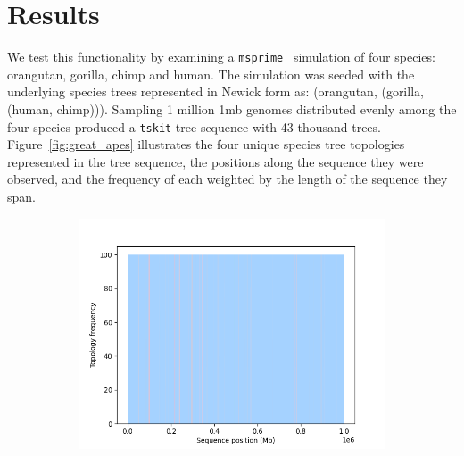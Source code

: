 \documentclass{article}
\newcommand{\tskit}{{\texttt{tskit}}}
\newcommand{\msprime}{{\texttt{msprime}}}
\begin{document}
\section{Results}
We test this functionality by examining a \msprime{}~\citep{msprime} simulation of four species:
orangutan, gorilla, chimp and human. The simulation was seeded with the underlying
species trees represented in Newick form as: (orangutan, (gorilla, (human, chimp))).
Sampling 1 million 1mb genomes distributed evenly among the four species
produced a \tskit{} tree sequence with 43 thousand trees.
Figure~\ref{fig:great_apes} illustrates the four unique
species tree topologies represented in the tree sequence, the positions
along the sequence they were observed, and the frequency of each weighted by
the length of the sequence they span.

\begin{figure}[H]
    \begin{minipage}{.48\textwidth}
        \begin{subfigure}{\linewidth}
            \includegraphics[scale=0.48]{great_apes_area_plot.png}
        \end{subfigure}
    \end{minipage}
    \begin{minipage}{.48\textwidth}
        \begin{minipage}{.4\textwidth}
            \begin{subfigure}[b]{\linewidth}
                
            \end{subfigure}

\end{minipage}
\end{minipage}
\end{figure}
\end{document}
